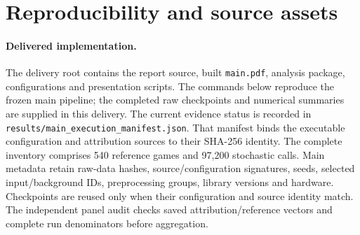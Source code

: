 \section{Reproducibility and source assets}
\label{app:reproduction}

\paragraph{Delivered implementation.}
The delivery root contains the report source, built \texttt{main.pdf}, analysis package, configurations and presentation scripts. The commands below reproduce the frozen main pipeline; the completed raw checkpoints and numerical summaries are supplied in this delivery. The current evidence status is recorded in \texttt{results/main\_execution\_manifest.json}. That manifest binds the executable configuration and attribution sources to their SHA-256 identity. The complete inventory comprises 540 reference games and 97,200 stochastic calls. Main metadata retain raw-data hashes, source/configuration signatures, seeds, selected input/background IDs, preprocessing groups, library versions and hardware. Checkpoints are reused only when their configuration and source identity match. The independent panel audit checks saved attribution/reference vectors and complete run denominators before aggregation.

